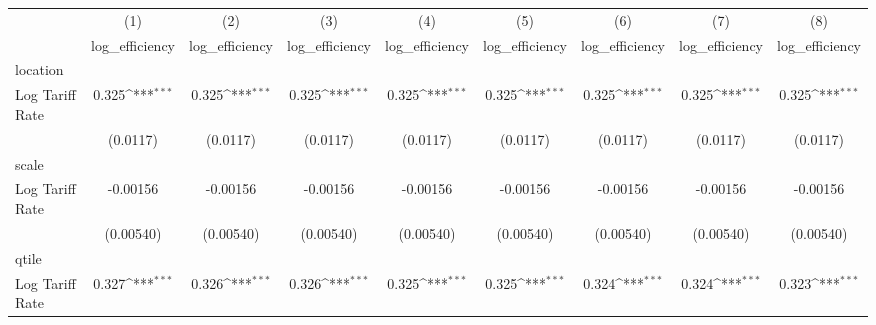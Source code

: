 {
\def\sym#1{\ifmmode^{#1}\else\(^{#1}\)\fi}
\begin{tabular}{l*{8}{c}}
\hline\hline
                    &\multicolumn{1}{c}{(1)}&\multicolumn{1}{c}{(2)}&\multicolumn{1}{c}{(3)}&\multicolumn{1}{c}{(4)}&\multicolumn{1}{c}{(5)}&\multicolumn{1}{c}{(6)}&\multicolumn{1}{c}{(7)}&\multicolumn{1}{c}{(8)}\\
                    &\multicolumn{1}{c}{log\_efficiency}&\multicolumn{1}{c}{log\_efficiency}&\multicolumn{1}{c}{log\_efficiency}&\multicolumn{1}{c}{log\_efficiency}&\multicolumn{1}{c}{log\_efficiency}&\multicolumn{1}{c}{log\_efficiency}&\multicolumn{1}{c}{log\_efficiency}&\multicolumn{1}{c}{log\_efficiency}\\
\hline
location            &                     &                     &                     &                     &                     &                     &                     &                     \\
Log Tariff Rate     &       0.325\sym{***}&       0.325\sym{***}&       0.325\sym{***}&       0.325\sym{***}&       0.325\sym{***}&       0.325\sym{***}&       0.325\sym{***}&       0.325\sym{***}\\
                    &    (0.0117)         &    (0.0117)         &    (0.0117)         &    (0.0117)         &    (0.0117)         &    (0.0117)         &    (0.0117)         &    (0.0117)         \\
\hline
scale               &                     &                     &                     &                     &                     &                     &                     &                     \\
Log Tariff Rate     &    -0.00156         &    -0.00156         &    -0.00156         &    -0.00156         &    -0.00156         &    -0.00156         &    -0.00156         &    -0.00156         \\
                    &   (0.00540)         &   (0.00540)         &   (0.00540)         &   (0.00540)         &   (0.00540)         &   (0.00540)         &   (0.00540)         &   (0.00540)         \\
\hline
qtile               &                     &                     &                     &                     &                     &                     &                     &                     \\
Log Tariff Rate     &       0.327\sym{***}&       0.326\sym{***}&       0.326\sym{***}&       0.325\sym{***}&       0.325\sym{***}&       0.324\sym{***}&       0.324\sym{***}&       0.323\sym{***}\\

\end{tabular}}
